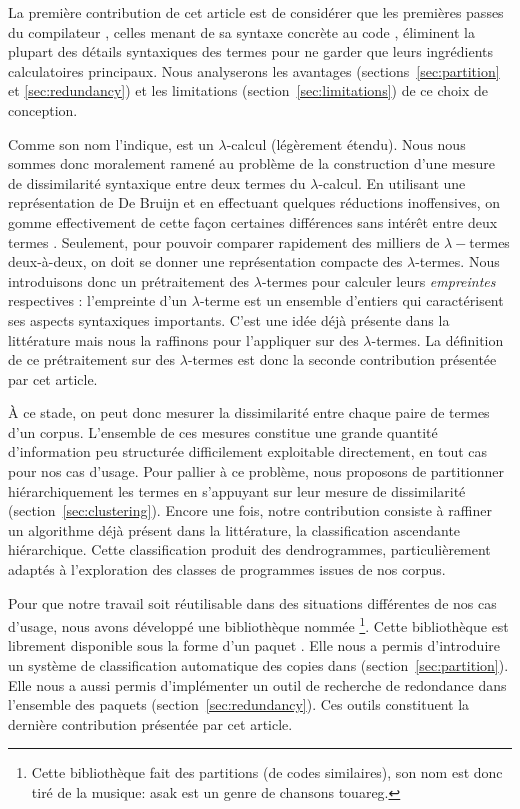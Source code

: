 La première contribution de cet article est de considérer que les
premières passes du compilateur {\OCaml}, celles menant de sa syntaxe
concrète au code {\LambdaCode}, éliminent la plupart des détails
syntaxiques des termes {\OCaml} pour ne garder que leurs ingrédients
calculatoires principaux. Nous analyserons les avantages
(sections~\ref{sec:partition} et \ref{sec:redundancy}) et les
limitations (section~\ref{sec:limitations}) de ce choix de conception.

Comme son nom l'indique, {\LambdaCode} est un $\lambda$-calcul
(légèrement étendu). Nous nous sommes donc moralement ramené au
problème de la construction d'une mesure de dissimilarité syntaxique
entre deux termes du $\lambda$-calcul. En utilisant une représentation
de De Bruijn et en effectuant quelques réductions inoffensives, on
gomme effectivement de cette façon certaines différences sans intérêt
entre deux termes {\OCaml}. Seulement, pour pouvoir comparer
rapidement des milliers de $\lambda-$termes deux-à-deux, on doit se
donner une représentation compacte des $\lambda$-termes. Nous
introduisons donc un prétraitement des $\lambda$-termes pour calculer leurs \textit{empreintes}
respectives : l'empreinte d'un $\lambda$-terme est un ensemble
d'entiers qui caractérisent ses aspects syntaxiques importants. C'est
une idée déjà présente dans la littérature mais nous la raffinons pour
l'appliquer sur des $\lambda$-termes.  La définition de ce
prétraitement sur des $\lambda$-termes est donc la seconde
contribution présentée par cet article.

À ce stade, on peut donc mesurer la dissimilarité entre chaque paire de termes d'un corpus. L'ensemble de ces mesures
constitue une grande quantité d'information peu structurée
difficilement exploitable directement, en tout cas pour nos cas
d'usage. Pour pallier à ce problème, nous proposons de partitionner hiérarchiquement
les termes en s'appuyant sur leur mesure de dissimilarité
(section~\ref{sec:clustering}). Encore une fois, notre contribution
consiste à raffiner un algorithme déjà présent dans la littérature, la
classification ascendante hiérarchique. Cette classification produit
des dendrogrammes, particulièrement adaptés à l'exploration des
classes de programmes issues de nos corpus.

Pour que notre travail soit réutilisable dans des situations
différentes de nos cas d'usage, nous avons développé une bibliothèque
nommée {\Asak}\footnote{Cette bibliothèque fait des partitions (de codes similaires), son nom est donc tiré de la musique: asak est un genre de chansons touareg.}.
Cette bibliothèque est librement disponible sous la forme d'un paquet {\Opam}.
Elle nous a permis d'introduire un système de classification automatique
des copies dans {\LearnOCaml} (section~\ref{sec:partition}). Elle nous a
aussi permis d'implémenter un outil de recherche de redondance dans
l'ensemble des paquets {\Opam} (section~\ref{sec:redundancy}). Ces outils
constituent la dernière contribution présentée par cet article.
